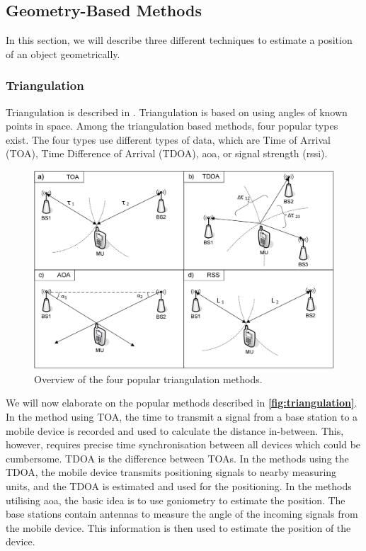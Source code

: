 \subsection{Geometry-Based Methods}
In this section, we will describe three different techniques to estimate a position of an object geometrically.

\subsubsection{Triangulation} \label{sec:triangulation}
Triangulation is described in \cite{Triangulation}. Triangulation is based on using angles of known points in space. Among the triangulation based methods, four popular types exist. The four types use different types of data, which are Time of Arrival (TOA), Time Difference of Arrival (TDOA), \acrlong{aoa}, or signal strength (\gls{rssi}).

\begin{figure}[H]
    \centering
    \includegraphics[scale=0.9939]{Images/ProblemAnalysis/triangulation.PNG}
    \caption{Overview of the four popular triangulation methods.\cite{triangulation01}}
    \label{fig:triangulation}
\end{figure}

We will now elaborate on the popular methods described in \textbf{\autoref{fig:triangulation}}. In the method using TOA, the time to transmit a signal from a base station to a mobile device is recorded and used to calculate the distance in-between. This, however, requires precise time synchronisation between all devices which could be cumbersome. TDOA is the difference between TOAs. In the methods using the TDOA, the mobile device transmits positioning signals to nearby measuring units, and the TDOA is estimated and used for the positioning. In the methods utilising \gls{aoa}, the basic idea is to use goniometry to estimate the position. The base stations contain antennas to measure the angle of the incoming signals from the mobile device. This information is then used to estimate the position of the device.\cite{triangulation01}

